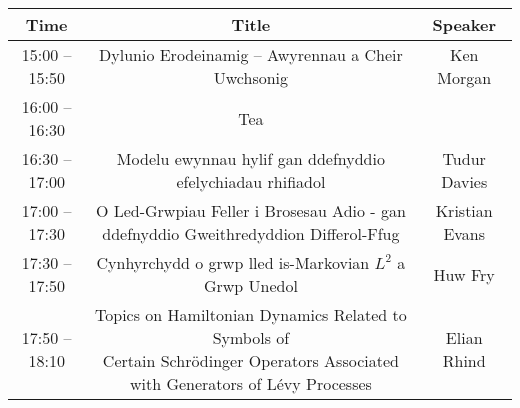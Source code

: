\documentclass{article}
\begin{document}
\begin{center}
 \begin{table}[!ht]
  \centering
  \begin{tabular}{c | c | c}
   \toprule
   \textbf{Time} & \textbf{Title} & \textbf{Speaker} \\
   \midrule
    15:00 -- 15:50 & Dylunio Erodeinamig – Awyrennau a Cheir Uwchsonig & Ken Morgan \\
   \midrule
    16:00 -- 16:30 & \cellcolor{blue!25}Tea & \\
   \midrule
    16:30 -- 17:00 & Modelu ewynnau hylif gan ddefnyddio efelychiadau rhifiadol  & Tudur Davies \\
   \midrule
    17:00 -- 17:30 & O Led-Grwpiau Feller i Brosesau Adio - gan ddefnyddio Gweithredyddion Differol-Ffug & Kristian Evans \\
   \midrule
    17:30 -- 17:50 & Cynhyrchydd o grwp lled is-Markovian $L^2$ a Grwp Unedol & Huw Fry \\
   \midrule
    17:50 -- 18:10 & \makecell{Topics on Hamiltonian Dynamics Related to Symbols of \\Certain Schr\"odinger Operators Associated with Generators of L\'evy Processes} & Elian Rhind \\
    \bottomrule
  \end{tabular}
 \end{table}
\end{center}

\end{document}
